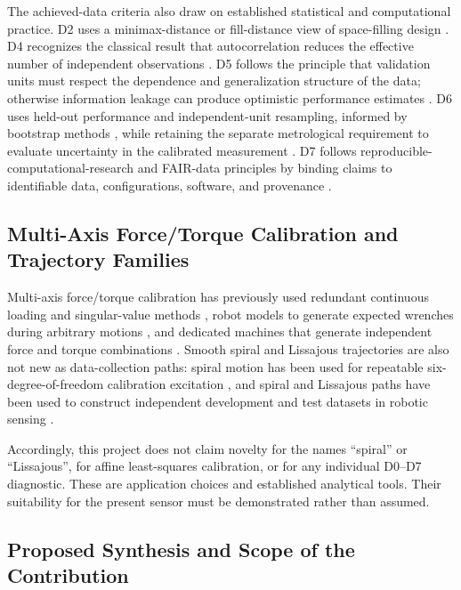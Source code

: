 \documentclass[11pt,a4paper]{article}
\begin{document}
The achieved-data criteria also draw on established statistical and
computational practice. D2 uses a minimax-distance or fill-distance view of
space-filling design \cite{pronzato2017}. D4 recognizes the classical result
that autocorrelation reduces the effective number of independent observations
\cite{bayley1946}. D5 follows the principle that validation units must respect
the dependence and generalization structure of the data; otherwise information
leakage can produce optimistic performance estimates
\cite{kaufman2011,roberts2017}. D6 uses held-out performance and
independent-unit resampling, informed by bootstrap methods
\cite{efron1993}, while retaining the separate metrological requirement to
evaluate uncertainty in the calibrated measurement \cite{jcgm100}. D7 follows
reproducible-computational-research and FAIR-data principles by binding claims
to identifiable data, configurations, software, and provenance
\cite{sandve2013,wilkinson2016}.

\subsection{Multi-Axis Force/Torque Calibration and Trajectory Families}

Multi-axis force/torque calibration has previously used redundant continuous
loading and singular-value methods \cite{voyles1997}, robot models to generate
expected wrenches during arbitrary motions \cite{andrade2016}, and dedicated
machines that generate independent force and torque combinations
\cite{wang2022machine}. Smooth spiral and Lissajous trajectories are also not
new as data-collection paths: spiral motion has been used for repeatable
six-degree-of-freedom calibration excitation \cite{zhang2022}, and spiral and
Lissajous paths have been used to construct independent development and test
datasets in robotic sensing \cite{ha2023}.

Accordingly, this project does not claim novelty for the names ``spiral'' or
``Lissajous'', for affine least-squares calibration, or for any individual
D0--D7 diagnostic. These are application choices and established analytical
tools. Their suitability for the present sensor must be demonstrated rather
than assumed.

\subsection{Proposed Synthesis and Scope of the Contribution}
\end{document}
